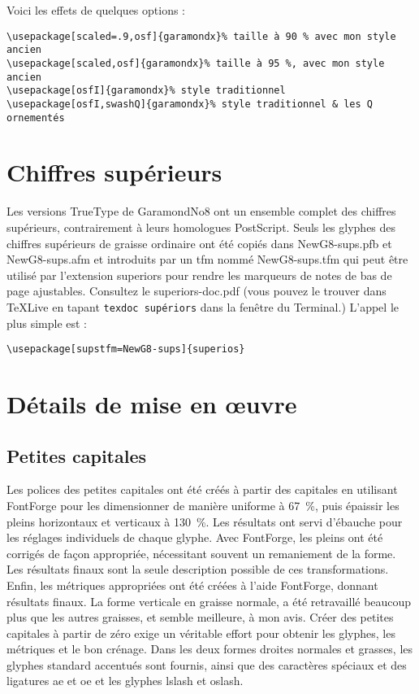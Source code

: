 \documentclass[12pt,english,french]{article}
\newcommand{\mnu}[1]{\textsf{#1}}
\newcommand{\cmd}[1]{\texttt{#1}}
\newcommand\lig{\raisebox{-2.4pt}{\char21}}
\begin{document}
Voici les effets de quelques options :%

\begin{verbatim}
\usepackage[scaled=.9,osf]{garamondx}% taille à 90 % avec mon style ancien 
\usepackage[scaled,osf]{garamondx}% taille à 95 %, avec mon style ancien 
\usepackage[osfI]{garamondx}% style traditionnel 
\usepackage[osfI,swashQ]{garamondx}% style traditionnel & les Q ornementés
\end{verbatim}

\section{Chiffres supérieurs}

Les versions TrueType de GaramondNo8 ont un ensemble complet des chiffres supérieurs, contrairement à leurs homologues PostScript. Seuls les glyphes des chiffres supérieurs de graisse ordinaire ont été copiés dans \mnu{NewG8-sups.pfb} et \mnu{NewG8-sups.afm} et introduits par un \mnu{tfm} nommé \mnu{NewG8-sups.tfm} qui peut être utilisé par l'extension \mnu{superiors} pour rendre les marqueurs de notes de bas de page ajustables. Consultez le \mnu{superiors-doc.pdf} (vous pouvez le trouver dans \TeX Live en tapant \cmd{texdoc supériors} dans la fenêtre du Terminal.) L'appel le plus simple est :

\begin{verbatim}
\usepackage[supstfm=NewG8-sups]{superios}
\end{verbatim}

\section{Détails de mise en œuvre}

\subsection{Petites capitales}

Les polices des petites capitales ont été créés à partir des capitales en utilisant FontForge pour les dimensionner de manière uniforme à 67~\%, puis épaissir les pleins horizontaux et verticaux à 130~\%. Les résultats ont servi d'ébauche pour les réglages individuels de chaque glyphe. Avec FontForge, les pleins ont été corrigés de façon appropriée, nécessitant souvent un remaniement de la forme. Les résultats finaux sont la seule description possible de ces transformations. Enfin, les métriques appropriées ont été créées à l'aide FontForge, donnant résultats finaux. La forme verticale en graisse normale, a été retravaillé beaucoup plus que les autres graisses, et semble meilleure, à mon avis. Créer des petites capitales à partir de zéro exige un véritable effort pour obtenir les glyphes, les métriques et le bon crénage. Dans les deux formes droites normales et grasses, les glyphes standard accentués sont fournis, ainsi que des caractères spéciaux et des ligatures a\lig e et o\lig e et les glyphes \mnu{lslash} et \mnu{oslash}.
\end{document}
